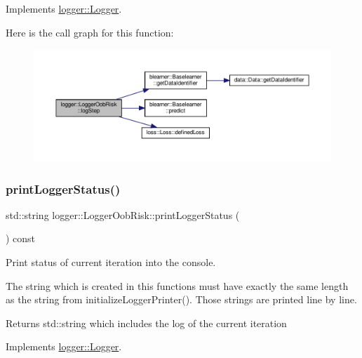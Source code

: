 Implements \hyperlink{classlogger_1_1_logger_a91d987a86698e455b6fd3468f266d3fe}{logger\+::\+Logger}.

Here is the call graph for this function\+:
\nopagebreak
\begin{figure}[H]
\begin{center}
\leavevmode
\includegraphics[width=350pt]{classlogger_1_1_logger_oob_risk_a4b0ea670a7970bca31037efab99cc06a_cgraph}
\end{center}
\end{figure}
\mbox{\label{classlogger_1_1_logger_oob_risk_a446e3e0c3766c8cda1add83c09d2e968}} 
\subsubsection{\texorpdfstring{print\+Logger\+Status()}{printLoggerStatus()}}
{\footnotesize\ttfamily std\+::string logger\+::\+Logger\+Oob\+Risk\+::print\+Logger\+Status (\begin{DoxyParamCaption}{ }\end{DoxyParamCaption}) const\hspace{0.3cm}{\ttfamily [virtual]}}



Print status of current iteration into the console. 

The string which is created in this functions must have exactly the same length as the string from {\ttfamily initialize\+Logger\+Printer()}. Those strings are printed line by line.

\begin{DoxyReturn}{Returns}
{\ttfamily std\+::string} which includes the log of the current iteration 
\end{DoxyReturn}


Implements \hyperlink{classlogger_1_1_logger_abad818a7e8053ca84cb267e883b5e377}{logger\+::\+Logger}.

